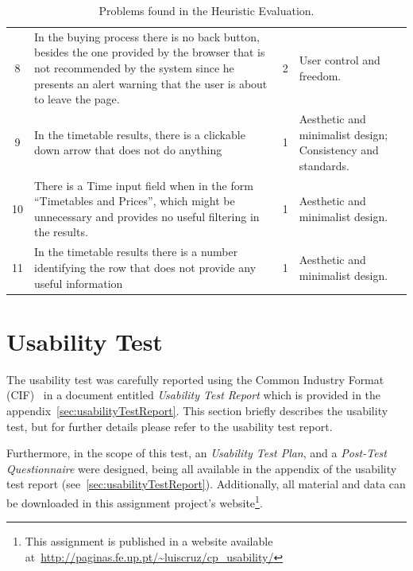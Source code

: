 \documentclass[a4paper]{article}
\begin{document}
\begin{table}[h]
\begin{center}
\begin{tabular}{c | p{8cm} | c | p{4.5cm}}
8 & In the buying process there is no back button, besides the one provided by the browser that is not recommended by the system since he presents an alert warning that the user is about to leave the page. & \cellcolor{orange!20}2 & User control and freedom.\\

9  &  In the timetable results, there is a clickable down arrow that does not do anything  & \cellcolor{yellow!10} 1 &  Aesthetic and minimalist design; Consistency and standards.  \\

	10  &  There is a Time input field when in the form ``Timetables and Prices'', which might be unnecessary and provides no useful filtering in the results.  & \cellcolor{yellow!10} 1 &  Aesthetic and minimalist design.  \\
	
		11 &  In the timetable results there is a number identifying the row that does not provide any useful information & \cellcolor{yellow!10} 1 & Aesthetic and minimalist design.\\
	
\hline
\end{tabular}
\end{center}
\caption{Problems found in the Heuristic Evaluation.}
\label{tab:heuristic_results}
\end{table}


\section{Usability Test}

The usability test was carefully reported using the Common Industry Format (CIF)~\citep{iusr2006cif} in a document entitled \emph{Usability Test Report} which is provided in the appendix~\ref{sec:usabilityTestReport}. This section briefly describes the usability test, but for further details please refer to the usability test report.

Furthermore, in the scope of this test, an \emph{Usability Test Plan}, and a \emph{Post-Test Questionnaire} were designed, being all available in the appendix of the usability test report (see~\ref{sec:usabilityTestReport}). Additionally, all material and data can be downloaded in this assignment project's website\footnote{This assignment is published in a website available at~\url{http://paginas.fe.up.pt/~luiscruz/cp_usability/}}.
\end{document}
